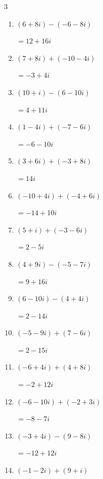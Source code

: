 \begin{multicols}{3}
\begin{enumerate}
  \item $\displaystyle (6+8i) - (-6-8i)$

        $\displaystyle =12+16i$

  \item $\displaystyle (7+8i) + (-10-4i)$

        $\displaystyle =-3+4i$

  \item $\displaystyle (10+i) - (6-10i)$

        $\displaystyle =4+11i$

  \item $\displaystyle (1-4i) + (-7-6i)$

        $\displaystyle =-6-10i$

  \item $\displaystyle (3+6i) + (-3+8i)$

        $\displaystyle =14i$

  \item $\displaystyle (-10+4i) + (-4+6i)$

        $\displaystyle =-14+10i$

  \item $\displaystyle (5+i) + (-3-6i)$

        $\displaystyle =2-5i$

  \item $\displaystyle (4+9i) - (-5-7i)$

        $\displaystyle =9+16i$

  \item $\displaystyle (6-10i) - (4+4i)$

        $\displaystyle =2-14i$

  \item $\displaystyle (-5-9i) + (7-6i)$

        $\displaystyle =2-15i$

  \item $\displaystyle (-6+4i) + (4+8i)$

        $\displaystyle =-2+12i$

  \item $\displaystyle (-6-10i) + (-2+3i)$

        $\displaystyle =-8-7i$

\columnbreak %

  \item $\displaystyle (-3+4i) - (9-8i)$

        $\displaystyle =-12+12i$

  \item $\displaystyle (-1-2i) + (9+i)$


\end{enumerate}
\end{multicols}
